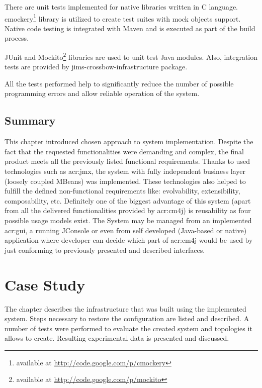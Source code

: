 \documentclass[11pt,openany]{book}
\begin{document}
      There are unit tests implemented for native libraries written in C language. cmockery\footnote{available at
      \url{http://code.google.com/p/cmockery}} library is utilized to create test suites with mock objects support.
      Native code testing is integrated with Maven and is executed as part of the build process.

      JUnit and Mockito\footnote{available at \url{http://code.google.com/p/mockito}} libraries are used to unit test
      Java modules. Also, integration tests are provided by jims-crossbow-infrastructure package.

      All the tests performed help to significantly reduce the number of possible programming errors and allow reliable
      operation of the system.
      

    \section*{Summary}
    \label{sec:impl:summary}

      This chapter introduced chosen approach to system implementation. Despite the fact that the requested
      functionalities were demanding and complex, the final product meets all the previously listed functional
      requirements. Thanks to used technologies such as \gls{acr:jmx}, the system with fully independent business layer
      (loosely coupled MBeans) was implemented. These technologies also helped to fulfill the defined non-functional
      requirements like: evolvability, extensibility, composability, etc. Definitely one of the biggest advantage of
      this system (apart from all the delivered functionalities provided by \gls{acr:cm4j}) is reusability as four
      possible usage models exist. The System may be managed from an implemented \gls{acr:gui}, a running JConsole or
      even from self developed (Java-based or native) application where developer can decide which part of
      \gls{acr:cm4j} would be used by just conforming to previously presented and described interfaces.


  \chapter{Case Study}
  \label{chap:cs}

    The chapter describes the infrastructure that was built using the implemented system. Steps necessary to restore the
    configuration are listed and described. A number of tests were performed to evaluate the created system and
    topologies it allows to create. Resulting experimental data is presented and discussed.
\end{document}
